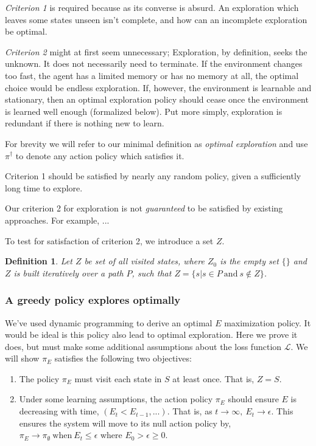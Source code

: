 \documentclass[9pt,twocolumn,twoside]{pnas-new}
\newtheorem{definition}{Definition}
\begin{document}
\textit{Criterion 1} is required because as its converse is absurd. An exploration which leaves some states unseen isn't complete, and how can an incomplete exploration be optimal.

\textit{Criterion 2} might at first seem unnecessary; Exploration, by definition, seeks the unknown. It does not necessarily need to terminate. If the environment changes too fast, the agent has a limited memory or has no memory at all, the optimal choice would be endless exploration. If, however, the environment is learnable and stationary, then an optimal exploration policy should cease once the environment is learned well enough (formalized below). Put more simply, exploration is redundant if there is nothing new to learn.

For brevity we will refer to our minimal definition as \textit{optimal exploration} and use $\pi^{\dagger}$ to denote any action policy which satisfies it.

Criterion 1 should be satisfied by nearly any random policy, given a sufficiently long time to explore.

Our criterion 2 for exploration is not \textit{guaranteed} to be satisfied by existing approaches.  For example, ... %

To test for satisfaction of criterion 2, we introduce a set $Z$. 

\begin{definition}
    Let $Z$ be set of all visited states, where $Z_0$ is the empty set $\{\}$ and $Z$ is built iteratively over a path $P$, such that $Z = \{s | s \in P\ \text{and}\ s \not\in Z\}$.    
\end{definition}


\subsubsection*{A greedy policy explores optimally}
We've used dynamic programming to derive an optimal $E$ maximization policy. It would be ideal is this policy also lead to optimal exploration. Here we prove it does, but must make some additional assumptions about the loss function $\mathcal{L}$. We will show $\pi_E$ satisfies the following two objectives:

\begin{enumerate}[noitemsep,wide=0pt,leftmargin=\dimexpr\labelwidth+2\labelsep\relax]
    \item The policy $\pi_E$ must visit each state in $S$ at least once. That is, $Z = S$.
    \item Under some learning assumptions, the action policy $\pi_E$ should ensure $E$ is decreasing with time, $(E_t < E_{t-1}, ...)$. That is, as $t \rightarrow \infty,\ E_t \rightarrow \epsilon$. This ensures the system will move to its null action policy by, $\pi_E \rightarrow \pi_{\emptyset} \ \text{when} \ E_t \leq \epsilon$ where $E_0 > \epsilon \geq 0$.
\end{enumerate}
\end{document}
